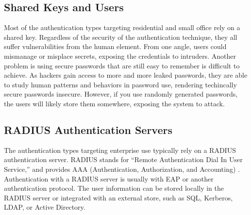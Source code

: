 \subsection{Shared Keys and Users}
Most of the authentication types targeting residential and small office rely on a shared key.
Regardless of the security of the authentication technique, they all suffer vulnerabilities from
the human element. From one angle, users could mismanage or misplace secrets, exposing the
credentials to intruders. Another problem is using secure passwords that are still easy to
remember is difficult to achieve. As hackers gain access to more and more leaked passwords, they
are able to study human patterns and behaviors in password use, rendering techincally secure
passwords insecure. However, if you use randomly generated passwords, the users will likely store
them somewhere, exposing the system to attack.

\subsection{RADIUS Authentication Servers}
The authentication types targeting enterprise use typically rely on a RADIUS authentication server.
RADIUS stands for ``Remote Authentication Dial In User Service,'' and provides AAA (Authentication,
Authorization, and Accounting) \cite{wiki:RADIUS}. Authentication with a RADIUS server is usually
with EAP or another authentication protocol. The user information can be stored locally in the
RADIUS server or integrated with an external store, such as SQL, Kerberos, LDAP, or Active
Directory.